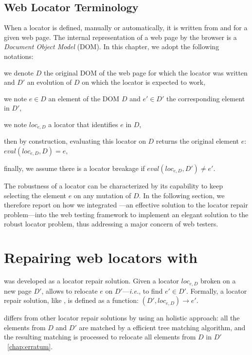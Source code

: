 \subsection{Web Locator Terminology}
When a locator is defined, manually or automatically, it is written from and for a given web page.
The internal representation of a web page by the browser is a \emph{Document Object Model} (DOM).
In this chapter, we adopt the following notations:
\begin{compactitem}
    \item we denote $D$ the original DOM of the web page for which the locator was written and $D'$ an evolution of $D$ on which the locator is expected to work,
    \item we note $e \in D$ an element of the DOM $D$ and $e'\in D'$ the corresponding element in $D'$,
    \item we note $loc_{e, D}$ a locator that identifies $e$ in $D$,
    \item then by construction, evaluating this locator on $D$ returns the original element $e$: $eval(loc_{e, D}, D) = e$,
    \item finally, we assume there is a locator breakage if $eval(loc_{e, D}, D') \neq e'$.
\end{compactitem}

The robustness of a locator can be characterized by its capability to keep selecting the element $e$ on any mutation of $D$.
In the following section, we therefore report on how we integrated \erratum---an effective solution to the locator repair problem---into the \cerberus web testing framework to implement an elegant solution to the robust locator problem, thus addressing a major concern of web testers.

\section{Repairing web locators with \erratum}\label{sec:erratum}
\erratum was developed as a locator repair solution. 
Given a locator $loc_{e, D}$ broken on a new page $D'$, \erratum allows to relocate $e$ on $D'$---\emph{i.e.}, to find $e' \in D'$.
Formally, a locator repair solution, like \erratum, is defined as a function: $(D', loc_{e, D}) \to e'$.

\erratum differs from other locator repair solutions by using an holistic approach: all the elements from $D$ and $D'$ are matched by a efficient tree matching algorithm, and the resulting matching is processed to relocate all elements from $D$ in $D'$~\ref{chap:erratum}.

